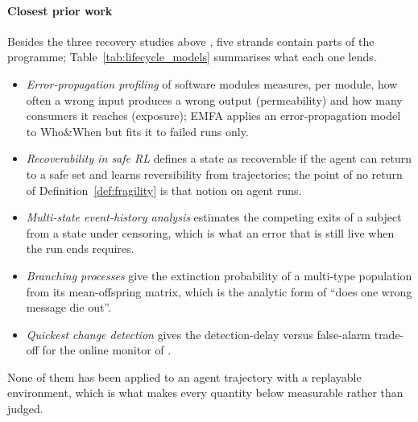 \paragraph{Closest prior work} Besides the three recovery studies above \cite{huang2024resilience,jamshidi2026cascade,zhu2026toolmaze}, five strands contain parts of the programme; Table~\ref{tab:lifecycle_models} summarises what each one lends.
\begin{itemize}[leftmargin=1.1em]
\item \emph{Error-propagation profiling} of software modules \cite{hiller2004epic} measures, per module, how often a wrong input produces a wrong output (permeability) and how many consumers it reaches (exposure); EMFA \cite{liao2026emfa} applies an error-propagation model to Who\&When but fits it to failed runs only.
\item \emph{Recoverability in safe RL} \cite{moldovan2012safe,grinsztajn2021reversibility} defines a state as recoverable if the agent can return to a safe set and learns reversibility from trajectories; the point of no return of Definition~\ref{def:fragility} is that notion on agent runs.
\item \emph{Multi-state event-history analysis} \cite{putter2007multistate,andersen1982cox,aalen1978empirical} estimates the competing exits of a subject from a state under censoring, which is what an error that is still live when the run ends requires.
\item \emph{Branching processes} \cite{harris1963branching} give the extinction probability of a multi-type population from its mean-offspring matrix, which is the analytic form of ``does one wrong message die out''.
\item \emph{Quickest change detection} \cite{page1954cusum,lorden1971,tartakovsky2014sequential} gives the detection-delay versus false-alarm trade-off for the online monitor of .
\end{itemize}
None of them has been applied to an agent trajectory with a replayable environment, which is what makes every quantity below measurable rather than judged.

